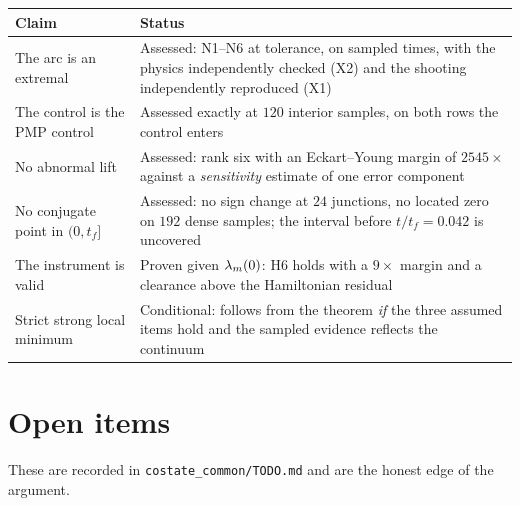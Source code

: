 \documentclass[11pt]{article}
\newcommand{\tf}{t_f}\newcommand{\R}{\mathbb{R}}
\newcommand{\file}[1]{\texttt{#1}}
\begin{document}
\begin{rig}
\begin{tabular}{@{}p{}p{}@{}}
\toprule
Claim & Status \\
\midrule
The arc is an extremal & Assessed: N1--N6 at tolerance, on sampled times, with the physics independently checked (X2) and the shooting independently reproduced (X1) \\
The control is the PMP control & Assessed exactly at $120$ interior samples, on both rows the control enters \\
No abnormal lift & Assessed: rank six with an Eckart--Young margin of $2545\times$ against a \emph{sensitivity} estimate of one error component \\
No conjugate point in $(0,\tf]$ & Assessed: no sign change at $24$ junctions, no located zero on $192$ dense samples; the interval before $t/\tf = 0.042$ is uncovered \\
The instrument is valid & Proven given $\lambda_m(0)$: H6 holds with a $9\times$ margin and a clearance above the Hamiltonian residual \\
Strict strong local minimum & Conditional: follows from the theorem \emph{if} the three assumed items hold and the sampled evidence reflects the continuum \\
\bottomrule
\end{tabular}
\end{rig}

\section{Open items}\label{sec:open}

These are recorded in \file{costate\_common/TODO.md} and are the honest edge of
the argument.
\end{document}
